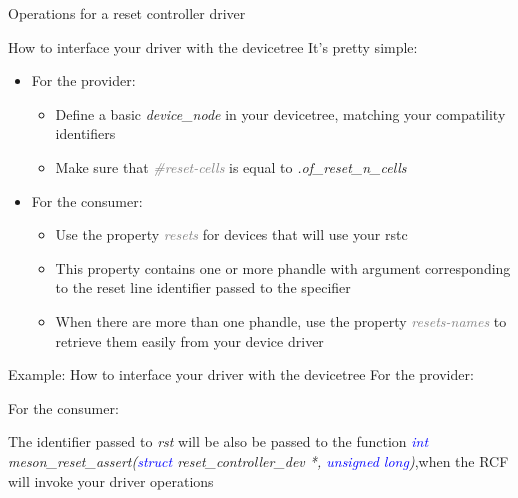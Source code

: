 \documentclass{beamer}
\begin{document}
\begin{frame}{Operations for a reset controller driver}
	
\end{frame}

\begin{frame}{How to interface your driver with the devicetree}
	It's pretty simple:
	\begin{itemize}
		\item For the provider:
		\begin{itemize}
			\item Define a basic \textit{device\_node} in your devicetree, matching your compatility identifiers
			\item Make sure that \textit{\textcolor{gray}{\#reset-cells}} is equal to \textit{.of\_reset\_n\_cells}
		\end{itemize}
		\item For the consumer:
		\begin{itemize}
			\item Use the property \textit{\textcolor{gray}{resets}} for devices that will use your rstc
			\item This property contains one or more phandle with argument corresponding to the reset line identifier passed to the specifier
			\item When there are more than one phandle, use the property \textit{\textcolor{gray}{resets-names}} to retrieve them easily from your device driver
		\end{itemize}
	\end{itemize}
\end{frame}

\begin{frame}{Example: How to interface your driver with the devicetree}
	For the provider:
	
	For the consumer:
	
	The identifier passed to \textit{rst} will be also be passed to the function \newline\textit{\textcolor{blue}{int} meson\_reset\_assert(\textcolor{blue}{struct} reset\_controller\_dev *, \textcolor{blue}{unsigned long})},\newline when the RCF will invoke your driver operations
\end{frame}
\end{document}
